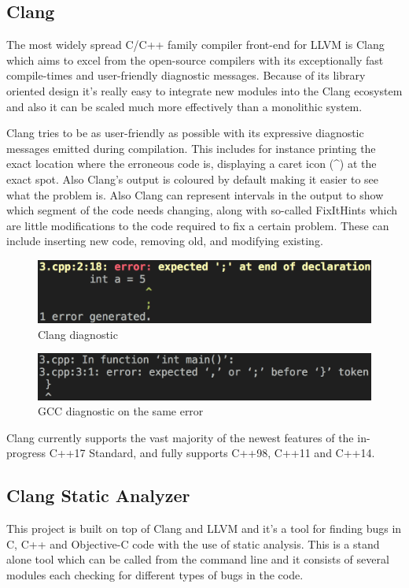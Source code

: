\subsection{Clang}
\par The most widely spread C/C++ family compiler front-end for LLVM is Clang which aims to excel from the open-source compilers with its exceptionally fast compile-times and user-friendly diagnostic messages\cite{clang_features}. Because of its library oriented design it's really easy to integrate new modules into the Clang ecosystem and also it can be scaled much more effectively than a monolithic system. \medskip
\par Clang tries to be as user-friendly as possible with its expressive diagnostic messages emitted during compilation. This includes for instance printing the exact location where the erroneous code is, displaying a caret icon (\textasciicircum) at the exact spot. Also Clang's output is coloured by default making it easier to see what the problem is. Also Clang can represent intervals in the output to show which segment of the code needs changing, along with so-called FixItHints which are little modifications to the code required to fix a certain problem. These can include inserting new code, removing old, and modifying existing.
\begin{figure}[h]
	\caption{Clang diagnostic}
	\includegraphics[scale = 0.4]{images/clang_diag}
\end{figure}
\begin{figure}[h]
	\caption{GCC diagnostic on the same error}
	\includegraphics[scale = 0.337]{images/gcc_diag}
\end{figure}
\par Clang currently supports the vast majority of the newest features of the in-progress C++17 Standard, and fully supports C++98, C++11 and C++14\cite{clang_language_support}. 
\subsection{Clang Static Analyzer}
\par This project is built on top of Clang and LLVM and it's a tool for finding bugs in C, C++ and Objective-C code with the use of static analysis. This is a stand alone tool which can be called from the command line and it consists of several modules each checking for different types of bugs in the code.
